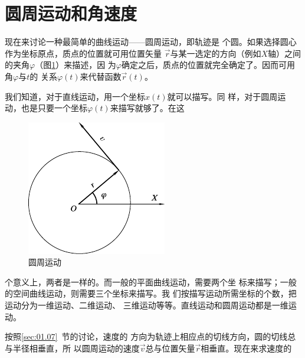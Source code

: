 \section{圆周运动和角速度}\label{sec:01.09}

现在来讨论一种最简单的曲线运动——圆周运动，即轨迹是
个圆。如果选择圆心作为坐标原点，质点的位置就可用位置矢量
$\vec{r}$与某一选定的方向（例如$X$轴）之间的夹角$\varphi$（图\ref{fig:01.17}）来描述，因
为$\varphi$确定之后，质点的位置就完全确定了。因而可用角$\varphi$与$t$的
关系$\varphi\left(t\right)$来代替函数$\vec{r}\left(t\right)$。

我们知道，对于直线运动，用一个坐标$x\left(t\right)$就可以描写。同
\clearpage
\noindent 样，对于圆周运动，也是只要一个坐标$\varphi\left(t\right)$来描写就够了。在这
\begin{figure}
  \centering \small
  \includegraphics{figure/fig01.17}
  \caption{圆周运动}
  \label{fig:01.17}
\end{figure}
个意义上，两者是一样的。而一般的平面曲线运动，需要两个坐
标来描写；一般的空间曲线运动，则需要三个坐标来描写。我
们按描写运动所需坐标的个数，把运动分为一维运动、二维运动、
三维运动等等。直线运动和圆周运动都是一维运动。

按照\ref{sec:01.07}~节的讨论，速度的
方向为轨迹上相应点的切线方向，圆的切线总与半径相垂直，所
以圆周运动的速度$\vec{v}$总与位置矢量$\vec{r}$相垂直。现在来求速度的

